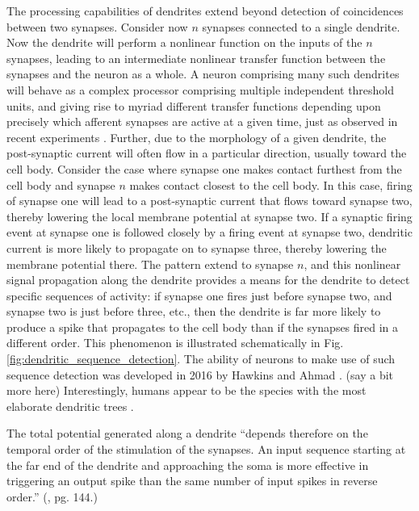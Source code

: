 The processing capabilities of dendrites extend beyond detection of coincidences between two synapses. Consider now $n$ synapses connected to a single dendrite. Now the dendrite will perform a nonlinear function on the inputs of the $n$ synapses, leading to an intermediate nonlinear transfer function between the synapses and the neuron as a whole. A neuron comprising many such dendrites will behave as a complex processor comprising multiple independent threshold units, and giving rise to myriad different transfer functions depending upon precisely which afferent synapses are active at a given time, just as observed in recent experiments \cite{sava2017}. Further, due to the morphology of a given dendrite, the post-synaptic current will often flow in a particular direction, usually toward the cell body. Consider the case where synapse one makes contact furthest from the cell body and synapse $n$ makes contact closest to the cell body. In this case, firing of synapse one will lead to a post-synaptic current that flows toward synapse two, thereby lowering the local membrane potential at synapse two. If a synaptic firing event at synapse one is followed closely by a firing event at synapse two, dendritic current is more likely to propagate on to synapse three, thereby lowering the membrane potential there. The pattern extend to synapse $n$, and this nonlinear signal propagation along the dendrite provides a means for the dendrite to detect specific sequences of activity: if synapse one fires just before synapse two, and synapse two is just before three, etc., then the dendrite is far more likely to produce a spike that propagates to the cell body than if the synapses fired in a different order. This phenomenon is illustrated schematically in Fig.\,\ref{fig:dendritic_sequence_detection}. The ability of neurons to make use of such sequence detection was developed in 2016 by Hawkins and Ahmad \cite{haah2015}. (say a bit more here) Interestingly, humans appear to be the species with the most elaborate dendritic trees \cite{el2003}.

\vspace{3em}
The total potential generated along a dendrite ``depends therefore on the temporal order of the stimulation of the synapses. An input sequence starting at the far end of the dendrite and approaching the soma is more effective in triggering an output spike than the same number of input spikes in reverse order.'' (\cite{geki2002}, pg. 144.)


